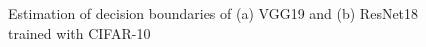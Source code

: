 \begin{figure}[t]
    \vspace{-10pt}
    \centering
    \vspace{-10pt}
    \caption{Estimation of decision boundaries of (a) VGG19 and (b) ResNet18 trained with CIFAR-10}
    \label{fig:CIFAR10}
    \vspace{-20pt}
\end{figure}